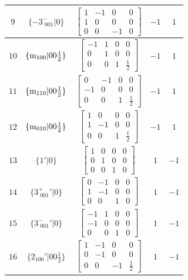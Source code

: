 \documentclass[fleqn,8pt]{jsarticle}
\begin{document}
\begin{longtable}{ccccc}
$ 9 $ & $ \{-3^{-}_{\,\,001}|0\} $ & $ \begin{bmatrix} 1 & -1 & 0 & 0 \\ 1 & 0 & 0 & 0 \\ 0 & 0 & -1 & 0 \end{bmatrix} $ & $ -1 $ & $ 1 $ \\ \hline
$ 10 $ & $ \{{\rm m}_{100}|0 0 \frac{1}{2}\} $ & $ \begin{bmatrix} -1 & 1 & 0 & 0 \\ 0 & 1 & 0 & 0 \\ 0 & 0 & 1 & \frac{1}{2} \end{bmatrix} $ & $ -1 $ & $ 1 $ \\ \hline
$ 11 $ & $ \{{\rm m}_{110}|0 0 \frac{1}{2}\} $ & $ \begin{bmatrix} 0 & -1 & 0 & 0 \\ -1 & 0 & 0 & 0 \\ 0 & 0 & 1 & \frac{1}{2} \end{bmatrix} $ & $ -1 $ & $ 1 $ \\ \hline
$ 12 $ & $ \{{\rm m}_{010}|0 0 \frac{1}{2}\} $ & $ \begin{bmatrix} 1 & 0 & 0 & 0 \\ 1 & -1 & 0 & 0 \\ 0 & 0 & 1 & \frac{1}{2} \end{bmatrix} $ & $ -1 $ & $ 1 $ \\ \hline
$ 13 $ & $ \{1{}'|0\} $ & $ \begin{bmatrix} 1 & 0 & 0 & 0 \\ 0 & 1 & 0 & 0 \\ 0 & 0 & 1 & 0 \end{bmatrix} $ & $ 1 $ & $ -1 $ \\ \hline
$ 14 $ & $ \{3^{+}_{\,\,001}{}'|0\} $ & $ \begin{bmatrix} 0 & -1 & 0 & 0 \\ 1 & -1 & 0 & 0 \\ 0 & 0 & 1 & 0 \end{bmatrix} $ & $ 1 $ & $ -1 $ \\ \hline
$ 15 $ & $ \{3^{-}_{\,\,001}{}'|0\} $ & $ \begin{bmatrix} -1 & 1 & 0 & 0 \\ -1 & 0 & 0 & 0 \\ 0 & 0 & 1 & 0 \end{bmatrix} $ & $ 1 $ & $ -1 $ \\ \hline
$ 16 $ & $ \{2{}_{100}{}'|0 0 \frac{1}{2}\} $ & $ \begin{bmatrix} 1 & -1 & 0 & 0 \\ 0 & -1 & 0 & 0 \\ 0 & 0 & -1 & \frac{1}{2} \end{bmatrix} $ & $ 1 $ & $ -1 $ \\ \hline

\end{longtable}
\end{document}
